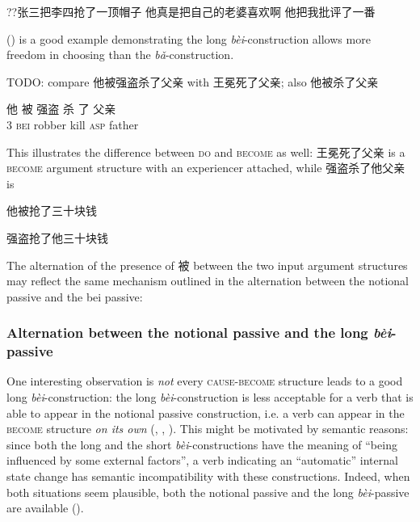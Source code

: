 \documentclass[UTF8, a4paper, oneside, scheme=plain, 12pt]{ctexrep}
\newcommand{\form}[1]{\emph{#1}}
\newcommand*{\category}[1]{\textsc{#1}}
\begin{document}
\begin{exe}
    \ex ??张三把李四抢了一顶帽子
    \ex *他真是把自己的老婆喜欢啊
    \ex 他把我批评了一番
\end{exe}

() is a good example 
demonstrating the long \form{bèi}-construction
allows more freedom in choosing 
than the \form{bǎ}-construction.

TODO: compare 他被强盗杀了父亲 with 王冕死了父亲; also 他被杀了父亲

\begin{exe}
    \ex\label{ex:verb-phrase.long-bei.external-possession-1} \gll 他 被 强盗 杀 了 父亲 \\
    3 \category{bei} robber kill \category{asp} father \\
\end{exe}

This illustrates the difference between \category{do} and \category{become} as well: 
王冕死了父亲 is a \category{become} argument structure 
with an experiencer attached,
while 强盗杀了他父亲 is 

他被抢了三十块钱 

强盗抢了他三十块钱

The alternation of the presence of 被 between the two input argument structures 
may reflect the same mechanism outlined in the alternation 
between the notional passive and the bei passive:

\subsubsection{Alternation between the notional passive and the long \form{bèi}-passive}
\label{sec:verb-phrase.bei.passive-alternation}

One interesting observation is \emph{not} every \category{cause}-\category{become} structure 
leads to a good long \form{bèi}-construction: 
the long \form{bèi}-construction
is less acceptable for 
a verb that is able to appear in the notional passive construction,
i.e. a verb can appear in the \category{become} structure \emph{on its own}
(,
,
).
This might be motivated by semantic reasons:
since both the long and the short \form{bèi}-constructions 
have the meaning of ``being influenced by some external factors'',
a verb indicating an ``automatic'' internal state change 
has semantic incompatibility with these constructions. 
Indeed, when both situations seem plausible, 
both the notional passive and the long \form{bèi}-passive 
are available ().
\end{document}
